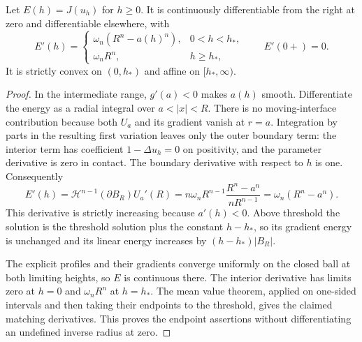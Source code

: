 \begin{proposition}\label{prop:radial-obstacle-energy-response}
Let $E(h)=J(u_h)$ for $h\geq0$. It is continuously differentiable from the right at zero and differentiable elsewhere, with
\[
 E'(h)=\begin{cases}
 \omega_n(R^n-a(h)^n),&0<h<h_*,\\
 \omega_nR^n,&h\geq h_*,
 \end{cases}
 \qquad E'(0+)=0.
\]
It is strictly convex on $(0,h_*)$ and affine on $[h_*,\infty)$.
\end{proposition}
\begin{proof}
In the intermediate range, $g'(a)<0$ makes $a(h)$ smooth. Differentiate the energy as a radial integral over $a<|x|<R$. There is no moving-interface contribution because both $U_a$ and its gradient vanish at $r=a$. Integration by parts in the resulting first variation leaves only the outer boundary term: the interior term has coefficient $1-\Delta u_h=0$ on positivity, and the parameter derivative is zero in contact. The boundary derivative with respect to $h$ is one. Consequently
\[
 E'(h)=\mathcal H^{n-1}(\partial B_R)U_a'(R)
 =n\omega_nR^{n-1}\frac{R^n-a^n}{nR^{n-1}}
 =\omega_n(R^n-a^n).
\]
This derivative is strictly increasing because $a'(h)<0$. Above threshold the solution is the threshold solution plus the constant $h-h_*$, so its gradient energy is unchanged and its linear energy increases by $(h-h_*)|B_R|$.

The explicit profiles and their gradients converge uniformly on the closed ball at both limiting heights, so $E$ is continuous there. The interior derivative has limits zero at $h=0$ and $\omega_nR^n$ at $h=h_*$. The mean value theorem, applied on one-sided intervals and then taking their endpoints to the threshold, gives the claimed matching derivatives. This proves the endpoint assertions without differentiating an undefined inverse radius at zero.
\end{proof}
